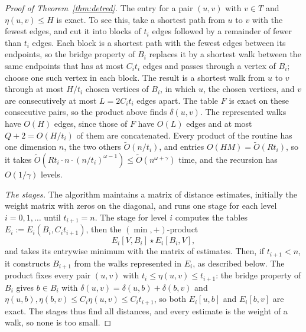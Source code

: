 \begin{proof}[Proof of Theorem~\ref{thm:detred}]
The entry for a pair $(u,v)$ with $v\in T$ and $\eta(u,v)\le H$ is exact. To see this, take a shortest path from $u$ to $v$ with the fewest edges, and cut it into blocks of $t_i$ edges followed by a remainder of fewer than $t_i$ edges. Each block is a shortest path with the fewest edges between its endpoints, so the bridge property of $B_i$ replaces it by a shortest walk between the same endpoints that has at most $C_it_i$ edges and passes through a vertex of $B_i$; choose one such vertex in each block. The result is a shortest walk from $u$ to $v$ through at most $H/t_i$ chosen vertices of $B_i$, in which $u$, the chosen vertices, and $v$ are consecutively at most $L=2C_it_i$ edges apart. The table $F$ is exact on these consecutive pairs, so the product above finds $\delta(u,v)$. The represented walks have $O(H)$ edges, since those of $F$ have $O(L)$ edges and at most $Q+2=O(H/t_i)$ of them are concatenated. Every product of the routine has one dimension $n$, the two others $\tilde O(n/t_i)$, and entries $O(HM)=\tilde O(Rt_i)$, so it takes $\tilde O(Rt_i\cdot n\cdot(n/t_i)^{\omega-1})\le\tilde O(n^{\omega+\gamma})$ time, and the recursion has $O(1/\gamma)$ levels.

\emph{The stages.} The algorithm maintains a matrix of distance estimates, initially the weight matrix with zeros on the diagonal, and runs one stage for each level $i=0,1,\dots$ until $t_{i+1}=n$. The stage for level $i$ computes the tables $E_i:=E_i(B_i,C_it_{i+1})$, then the $(\min,+)$-product
\[
E_i[V,B_i]\star E_i[B_i,V],
\]
and takes its entrywise minimum with the matrix of estimates. Then, if $t_{i+1}<n$, it constructs $B_{i+1}$ from the walks represented in $E_i$, as described below. The product fixes every pair $(u,v)$ with $t_i\le\eta(u,v)\le t_{i+1}$: the bridge property of $B_i$ gives $b\in B_i$ with $\delta(u,v)=\delta(u,b)+\delta(b,v)$ and $\eta(u,b),\eta(b,v)\le C_i\eta(u,v)\le C_it_{i+1}$, so both $E_i[u,b]$ and $E_i[b,v]$ are exact. The stages thus find all distances, and every estimate is the weight of a walk, so none is too small.


\end{proof}
